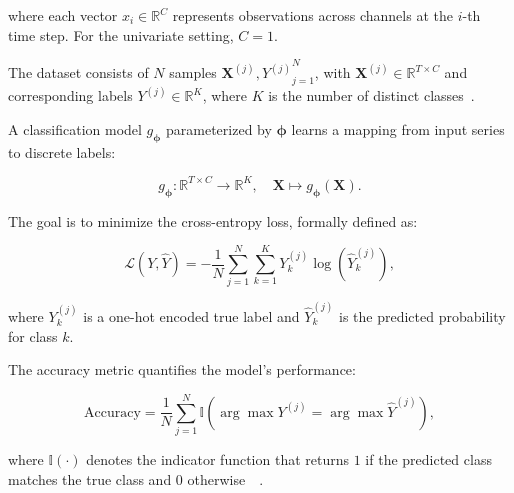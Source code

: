 where each vector $x_i \in \mathbb{R}^{C}$ represents observations across channels at the $i$-th time step. For the univariate setting, $C = 1$.


The dataset consists of $N$ samples ${\mathbf{X}^{(j)}, Y^{(j)}}_{j=1}^{N}$, with $\mathbf{X}^{(j)} \in \mathbb{R}^{T \times C}$ and corresponding labels $Y^{(j)} \in  \mathbb{R}^{K}$, where $K$ is the number of distinct classes~\cite{Ismail_Fawaz_2020}.

A classification model $g_{\boldsymbol{\phi}}$ parameterized by $\boldsymbol{\phi}$ learns a mapping from input series to discrete labels:

\begin{equation}
g_{\boldsymbol{\phi}}: \mathbb{R}^{T \times C} \rightarrow \mathbb{R}^{K}, \quad \mathbf{X} \mapsto g_{\boldsymbol{\phi}}(\mathbf{X}).
\end{equation}

The goal is to minimize the cross-entropy loss, formally defined as:

\begin{equation} \label{eq: cross}
\mathcal{L}(Y, \hat{Y}) = -\frac{1}{N}\sum_{j=1}^{N}\sum_{k=1}^{K}Y_k^{(j)} \log(\hat{Y}_k^{(j)}),
\end{equation}

where $Y_k^{(j)}$ is a one-hot encoded true label and $\hat{Y}_k^{(j)}$ is the predicted probability for class $k$.

The accuracy metric quantifies the model's performance:


\begin{equation} \label{eq:accuracy}
\text{Accuracy} = \frac{1}{N} \sum_{j=1}^{N} \mathbb{I}\left( \arg\max Y^{(j)} = \arg\max \hat{Y}^{(j)} \right),
\end{equation}

where $\mathbb{I}(\cdot)$ denotes the indicator function that returns $1$ if the predicted class matches the true class and $0$ otherwise~\unskip~\cite{Ismail_Fawaz_2020, ilbert2024dataaugmentationmultivariatetime}.



